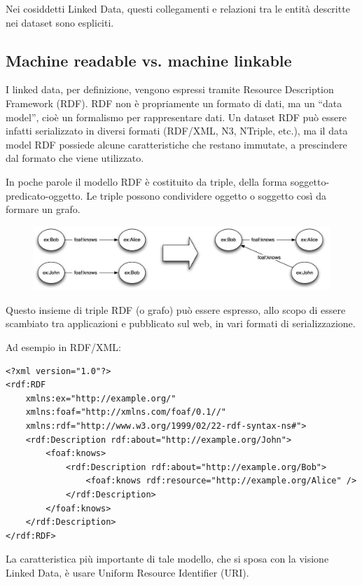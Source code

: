 Nei cosiddetti Linked Data, questi collegamenti e relazioni tra le entità descritte nei dataset sono espliciti.
\subsection{Machine readable vs. machine linkable}
I linked data, per definizione, vengono espressi tramite Resource Description Framework (RDF). RDF non è propriamente un formato di dati, ma un “data model”, cioè un formalismo per rappresentare dati. Un dataset RDF può essere infatti serializzato in diversi formati (RDF/XML, N3, NTriple, etc.), ma il data model RDF possiede alcune caratteristiche che restano immutate, a prescindere dal formato che viene utilizzato.

In poche parole il modello RDF è costituito da triple, della forma soggetto-predicato-oggetto. Le triple possono condividere oggetto o soggetto così da formare un grafo.

\begin{figure}[htbp]
  \centering
  \includegraphics[width=.9\textwidth]{./images/triples1-crop}
\end{figure}

Questo insieme di triple RDF (o grafo) può essere espresso, allo scopo di essere scambiato tra applicazioni e pubblicato sul web, in vari formati di serializzazione.

\clearpage

Ad esempio in RDF/XML:

\begin{lstlisting}
<?xml version="1.0"?>
<rdf:RDF
    xmlns:ex="http://example.org/"
    xmlns:foaf="http://xmlns.com/foaf/0.1//"
    xmlns:rdf="http://www.w3.org/1999/02/22-rdf-syntax-ns#">
    <rdf:Description rdf:about="http://example.org/John">
        <foaf:knows>
            <rdf:Description rdf:about="http://example.org/Bob">
                <foaf:knows rdf:resource="http://example.org/Alice" />
            </rdf:Description>
        </foaf:knows>
    </rdf:Description>
</rdf:RDF>
\end{lstlisting}


La caratteristica più importante di tale modello, che si sposa con la visione Linked Data, è usare Uniform Resource Identifier (URI).

